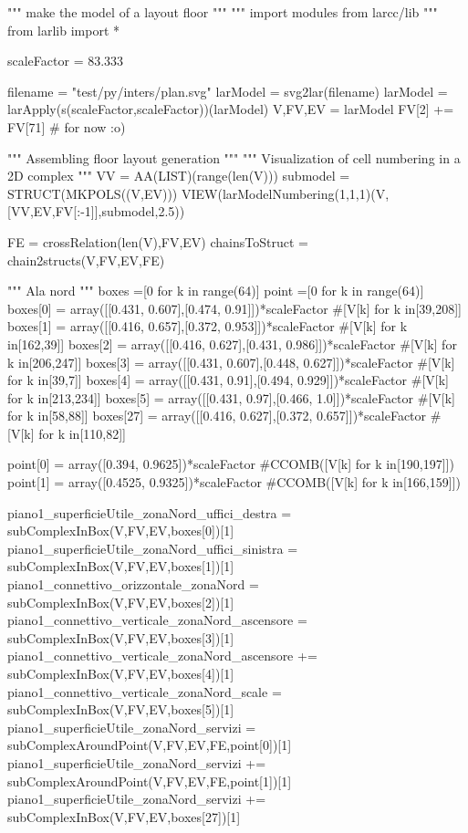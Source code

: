 """ make the model of a layout floor """
""" import modules from larcc/lib """
from larlib import *

scaleFactor = 83.333

filename = "test/py/inters/plan.svg"
larModel = svg2lar(filename)
larModel = larApply(s(scaleFactor,scaleFactor))(larModel)
V,FV,EV = larModel
FV[2] += FV[71]      # for now :o)

""" Assembling floor layout generation """
""" Visualization of cell numbering in a 2D complex """
VV = AA(LIST)(range(len(V)))
submodel = STRUCT(MKPOLS((V,EV)))
VIEW(larModelNumbering(1,1,1)(V,[VV,EV,FV[:-1]],submodel,2.5))

FE = crossRelation(len(V),FV,EV)
chainsToStruct = chain2structs(V,FV,EV,FE)

""" Ala nord """
boxes =[0 for k in range(64)]
point =[0 for k in range(64)]
boxes[0] = array([[0.431, 0.607],[0.474, 0.91]])*scaleFactor #[V[k] for k in[39,208]]
boxes[1] = array([[0.416, 0.657],[0.372, 0.953]])*scaleFactor #[V[k] for k in[162,39]]
boxes[2] = array([[0.416, 0.627],[0.431, 0.986]])*scaleFactor #[V[k] for k in[206,247]]
boxes[3] = array([[0.431, 0.607],[0.448, 0.627]])*scaleFactor #[V[k] for k in[39,7]]
boxes[4] = array([[0.431, 0.91],[0.494, 0.929]])*scaleFactor  #[V[k] for k in[213,234]]
boxes[5] = array([[0.431, 0.97],[0.466, 1.0]])*scaleFactor #[V[k] for k in[58,88]]
boxes[27] = array([[0.416, 0.627],[0.372, 0.657]])*scaleFactor #[V[k] for k in[110,82]]

point[0] = array([0.394, 0.9625])*scaleFactor #CCOMB([V[k] for k in[190,197]])
point[1] = array([0.4525, 0.9325])*scaleFactor #CCOMB([V[k] for k in[166,159]])

piano1_superficieUtile_zonaNord_uffici_destra = subComplexInBox(V,FV,EV,boxes[0])[1]
piano1_superficieUtile_zonaNord_uffici_sinistra = subComplexInBox(V,FV,EV,boxes[1])[1]
piano1_connettivo_orizzontale_zonaNord = subComplexInBox(V,FV,EV,boxes[2])[1]
piano1_connettivo_verticale_zonaNord_ascensore = subComplexInBox(V,FV,EV,boxes[3])[1]
piano1_connettivo_verticale_zonaNord_ascensore += subComplexInBox(V,FV,EV,boxes[4])[1]
piano1_connettivo_verticale_zonaNord_scale = subComplexInBox(V,FV,EV,boxes[5])[1]
piano1_superficieUtile_zonaNord_servizi = subComplexAroundPoint(V,FV,EV,FE,point[0])[1]
piano1_superficieUtile_zonaNord_servizi += subComplexAroundPoint(V,FV,EV,FE,point[1])[1]
piano1_superficieUtile_zonaNord_servizi += subComplexInBox(V,FV,EV,boxes[27])[1]

